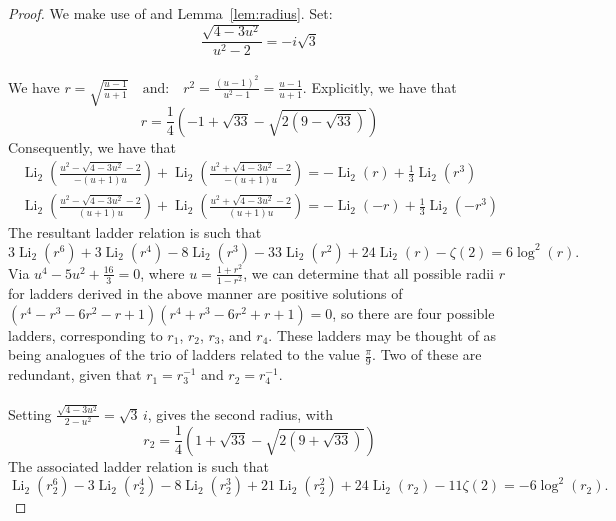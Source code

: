 \documentclass[12pt]{article}
\begin{document}
{\begin{proof}

We make use of  and  Lemma~\ref{lem:radius}. Set: 
\begin{equation*}
\frac{\sqrt{4-3u^2}}{ u^2 - 2} = -i \sqrt{3}
\end{equation*}
\\
We have $r = \sqrt{\frac{u - 1}{u + 1}} \quad \text{and:} \quad r^2 = \frac{(u - 1)^2}{u^2 - 1} = \frac{u - 1}{u + 1} $. 
 Explicitly, we have that 
\begin{equation}\label{radiusfornewladder1}
 r=\frac{1}{4} \left( -1 + \sqrt{33} - \sqrt{2 \left(9 - \sqrt{33} \right)} \right) 
\end{equation}
 Consequently, we have that 
\begin{equation*}
\begin{aligned}
\operatorname{Li}_2\left( \frac{u^2 - \sqrt{4 - 3 u^2} - 2}{-(u + 1) u} \right)
+ \operatorname{Li}_2\left( \frac{u^2 + \sqrt{4 - 3 u^2} - 2}{-(u + 1) u} \right)
= -\operatorname{Li}_2(r) + \frac{1}{3} \operatorname{Li}_2(r^3)\\
\operatorname{Li}_2\left( \frac{u^2 - \sqrt{4 - 3 u^2} - 2}{(u + 1) u} \right)
+ \operatorname{Li}_2\left( \frac{u^2 + \sqrt{4 - 3 u^2} - 2}{(u + 1) u} \right)
= -\operatorname{Li}_2(-r) + \frac{1}{3} \operatorname{Li}_2(-r^3)
\end{aligned}
\end{equation*}
 The resultant ladder relation is such that 
$$ 3 \operatorname{Li}_{2}(r^6) + 3 \operatorname{Li}_{2}(r^4) 
 - 8 \operatorname{Li}_{2}(r^3) - 33 \operatorname{Li}_{2}(r^2) + 24 \operatorname{Li}_{2}(r) - \zeta(2) = 
 6 \log^2(r). $$ 
 Via $u^4 - 5 u^2 + \frac{16}{3} = 0$, where $u = \frac{1+r^2}{1 - r^2}$, we can determine that 
 all possible radii $r$ for ladders derived in the above manner are positive solutions of $(r^4 - r^3 - 6 r^2 - r + 
 1) (r^4 + r^3 - 6 r^2 + r + 1) = 0$, so there are four possible ladders, corresponding to $r_1$, $r_2$, $r_3$, and $r_4$. 
 These ladders may be thought of as being analogues of the trio of ladders related to the value $\frac{\pi}{9}$. Two of these are 
 redundant, given that $r_1=r_3^{-1}$ and $r_2=r_4^{-1}$. 
\\
\\
 Setting $\frac{\sqrt{4 - 3u^2}}{2 - u^2} = \sqrt{3} \, i$, gives the second radius, with 
\begin{equation}\label{radiusfornewladder2}
 r_2 = \frac{1}{4} \left(1 + \sqrt{33} -  \sqrt{2 \left(9 + \sqrt{33} \right)} \right)
\end{equation}
 The associated ladder relation is such that 
 $$ \operatorname{Li}_{2}(r_2^6) - 3 \operatorname{Li}_{2}(r_2^4) - 
 8 \operatorname{Li}_{2}(r_2^3) + 
 21 \operatorname{Li}_{2}(r_2^2)
 + 24 \operatorname{Li}_{2}(r_2) - 11 \zeta(2) = -6 \log^{2}(r_2). $$


\end{proof}}
\end{document}
